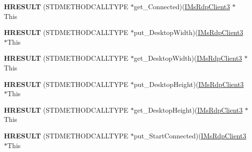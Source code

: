\begin{DoxyCompactItemize}
\item 
\mbox{\label{struct_m_s_t_s_c_lib_1_1_i_ms_rdp_client3_vtbl_a35526e8dee5373bc6d083522ea56665d}} 
{\bfseries H\+R\+E\+S\+U\+LT} (S\+T\+D\+M\+E\+T\+H\+O\+D\+C\+A\+L\+L\+T\+Y\+PE $\ast$get\+\_\+\+Connected)(\hyperlink{interface_m_s_t_s_c_lib_1_1_i_ms_rdp_client3}{I\+Ms\+Rdp\+Client3} $\ast$This
\item 
\mbox{\label{struct_m_s_t_s_c_lib_1_1_i_ms_rdp_client3_vtbl_a2fdccbeabfb1a5a1d0e6f4e3a1d6a5bd}} 
{\bfseries H\+R\+E\+S\+U\+LT} (S\+T\+D\+M\+E\+T\+H\+O\+D\+C\+A\+L\+L\+T\+Y\+PE $\ast$put\+\_\+\+Desktop\+Width)(\hyperlink{interface_m_s_t_s_c_lib_1_1_i_ms_rdp_client3}{I\+Ms\+Rdp\+Client3} $\ast$This
\item 
\mbox{\label{struct_m_s_t_s_c_lib_1_1_i_ms_rdp_client3_vtbl_a68cda05541f5688d48c799242b7c4057}} 
{\bfseries H\+R\+E\+S\+U\+LT} (S\+T\+D\+M\+E\+T\+H\+O\+D\+C\+A\+L\+L\+T\+Y\+PE $\ast$get\+\_\+\+Desktop\+Width)(\hyperlink{interface_m_s_t_s_c_lib_1_1_i_ms_rdp_client3}{I\+Ms\+Rdp\+Client3} $\ast$This
\item 
\mbox{\label{struct_m_s_t_s_c_lib_1_1_i_ms_rdp_client3_vtbl_a9a7cba5ed453f630a07c01beee9cef39}} 
{\bfseries H\+R\+E\+S\+U\+LT} (S\+T\+D\+M\+E\+T\+H\+O\+D\+C\+A\+L\+L\+T\+Y\+PE $\ast$put\+\_\+\+Desktop\+Height)(\hyperlink{interface_m_s_t_s_c_lib_1_1_i_ms_rdp_client3}{I\+Ms\+Rdp\+Client3} $\ast$This
\item 
\mbox{\label{struct_m_s_t_s_c_lib_1_1_i_ms_rdp_client3_vtbl_a667b84a04ad567611f5a90ff9e3105ad}} 
{\bfseries H\+R\+E\+S\+U\+LT} (S\+T\+D\+M\+E\+T\+H\+O\+D\+C\+A\+L\+L\+T\+Y\+PE $\ast$get\+\_\+\+Desktop\+Height)(\hyperlink{interface_m_s_t_s_c_lib_1_1_i_ms_rdp_client3}{I\+Ms\+Rdp\+Client3} $\ast$This
\item 
\mbox{\label{struct_m_s_t_s_c_lib_1_1_i_ms_rdp_client3_vtbl_ae1a3e638058b1a546afd12b0faba0feb}} 
{\bfseries H\+R\+E\+S\+U\+LT} (S\+T\+D\+M\+E\+T\+H\+O\+D\+C\+A\+L\+L\+T\+Y\+PE $\ast$put\+\_\+\+Start\+Connected)(\hyperlink{interface_m_s_t_s_c_lib_1_1_i_ms_rdp_client3}{I\+Ms\+Rdp\+Client3} $\ast$This

\end{DoxyCompactItemize}
